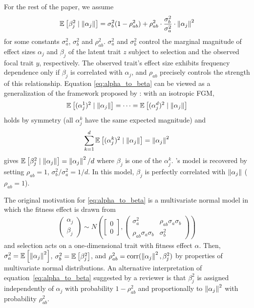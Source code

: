 \documentclass[10pt]{article}
\begin{document}
For the rest of the paper, we assume
\begin{align} \label{eq:alpha_to_beta}
    \mathbb{E}_{}\left[\beta_j^2 \mid \left\| \alpha_j \right\|\right] = \sigma_b^2 (1- \rho_{ab}^2) + \rho_{ab}^2 \cdot \frac{\sigma_b^2}{\sigma_a^2} \cdot \left\| \alpha_j \right\|^2
\end{align}
for some constants $\sigma_a^2$, $\sigma_b^2$ and $\rho_{ab}^2$.
$\sigma_a^2$ and $\sigma_b^2$ control the marginal magnitude of effect sizes $\alpha_j$ and $\beta_j$ of the latent trait $z$ subject to selection and the observed focal trait $y$, respectively.
The observed trait's effect size exhibits frequency dependence only if $\beta_j$ is correlated with $\alpha_j$,
and $\rho_{ab}$ precisely controls the strength of this relationship.
Equation \eqref{eq:alpha_to_beta} can be viewed as a generalization of the framework proposed by \citet{Simons2018popgeninterpretation}: with an isotropic FGM,
\begin{align}
    \mathbb{E}_{}\left[(\alpha_j^1)^2 \mid \left\| \alpha_j \right\|\right] = \cdots =
    \mathbb{E}_{}\left[(\alpha_j^d)^2 \mid \left\| \alpha_j \right\|\right]
\end{align}
holds by symmetry (all $\alpha_j^k$ have the same expected magnitude) and
\begin{align}
    \sum_{k=1}^d \mathbb{E}_{}\left[(\alpha_j^k)^2 \mid \left\| \alpha_j \right\|\right] = \left\| \alpha_j \right\|^2
\end{align}
gives $\mathbb{E}_{}\left[\beta_j^2 \mid \left\| \alpha_j \right\|\right] = \left\| \alpha_j \right\|^2 /d $ where $\beta_j$ is one of the $\alpha_j^k$. \citet{Simons2018popgeninterpretation}'s model is recovered by setting $\rho_{ab}=1$, $\sigma_b^2/\sigma_a^2 = 1/d$.
In this model, $\beta_j$ is perfectly correlated with $\left\| \alpha_j \right\|$ ($\rho_{ab}=1$).

The original motivation for \eqref{eq:alpha_to_beta} is a multivariate normal model in which the fitness effect is drawn from
\begin{gather} \label{eq:coa}
\begin{pmatrix}
        \alpha_j \\
        \beta_j
    \end{pmatrix}
    \sim
    N\left(
    \begin{bmatrix}
        0 \\
        0
    \end{bmatrix}
    , 
    \begin{pmatrix}
        \sigma_{a}^2 & \rho_{ab}\sigma_{a}\sigma_{b} \\
        \rho_{ab} \sigma_{a} \sigma_{b} & \sigma_{b}^2
    \end{pmatrix} 
    \right)
\end{gather}
and selection acts on a one-dimensional trait with fitness effect $\alpha$.
Then, $\sigma_a^2 = \mathbb{E}_{}\left[\left\| \alpha_j \right\|^2\right]$, $\sigma_b^2=\mathbb{E}_{}\left[\beta_j^2\right]$, and $\rho_{ab}^2 = \mathrm{corr}(\left\| \alpha_j \right\|^2, \beta_j^2)$ by properties of multivariate normal distributions.
An alternative interpretation of equation~\eqref{eq:alpha_to_beta} suggested by a reviewer is that $\beta_j^2$ is assigned independently of $\alpha_j$ with probability $1-\rho_{ab}^2$ and proportionally to $\left\| \alpha_j \right\|^2$ with probability $\rho_{ab}^2$.
\end{document}

